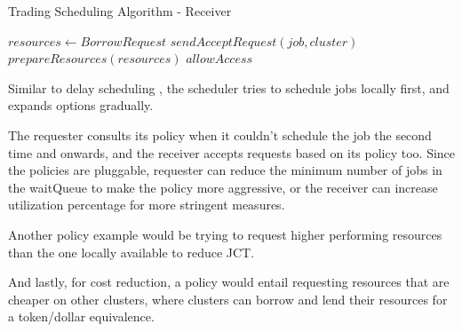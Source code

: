 \begin{algorithm}[H]
    \caption{Trading Scheduling Algorithm - Receiver}
    \begin{algorithmic}
            \State $ resources \gets BorrowRequest $  
             
            \State $sendAcceptRequest(job, cluster)$
            \State $prepareResources(resources)$
            \State $allowAccess$
            \EndIf
    \end{algorithmic}
\end{algorithm} 

Similar to delay scheduling \cite{zaharia_delay_2010}, the scheduler tries to schedule jobs locally first, and 
expands options gradually. 

The requester consults its policy when it couldn't schedule the job the second time and onwards, and the receiver 
accepts requests based on its policy too. Since the policies are pluggable, requester can reduce 
the minimum number of jobs in the waitQueue to make the policy more aggressive, 
or the receiver can increase utilization percentage for more stringent measures.

Another policy example would be trying to request higher performing resources than the one locally available 
to reduce JCT.

And lastly, for cost reduction, a policy would entail requesting resources that are cheaper on other clusters, where 
clusters can borrow and lend their resources for a token/dollar equivalence.